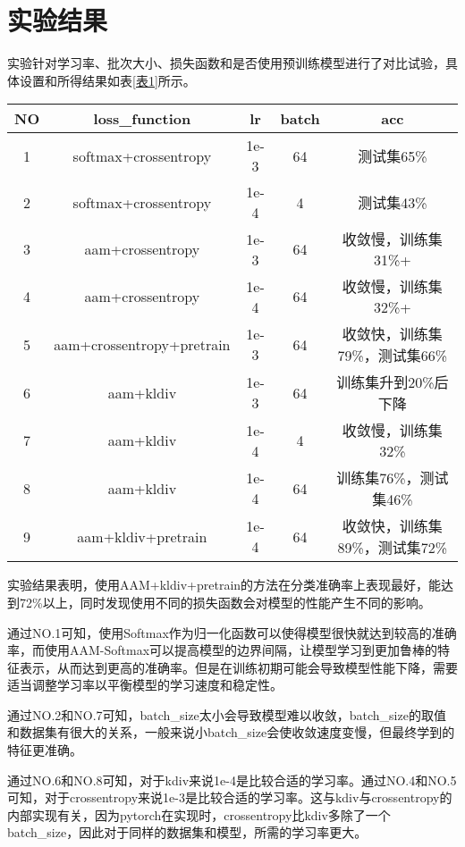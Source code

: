 \section{实验结果}
实验针对学习率、批次大小、损失函数和是否使用预训练模型进行了对比试验，具体设置和所得结果如表\ref{表1}所示。
\begin{center}
  \begin{tabular}{|c|c|c|c|c|}\hline
    NO&loss\_function &lr &batch&acc\\\hline
    1&softmax+crossentropy& 1e-3& 64&测试集65\%\\\hline
    2&softmax+crossentropy& 1e-4& 4&测试集43\%\\\hline
    3&aam+crossentropy& 1e-3& 64&收敛慢，训练集 31\%+\\\hline
    4&aam+crossentropy& 1e-4& 64&收敛慢，训练集 32\%+\\\hline
    5&aam+crossentropy+pretrain &1e-3& 64&收敛快，训练集79\%，测试集66\%\\\hline
    6&aam+kldiv& 1e-3& 64&训练集升到20\%后下降\\\hline
    7&aam+kldiv& 1e-4& 4 &收敛慢，训练集32\%\\\hline
    8&aam+kldiv &1e-4 &64&训练集76\%，测试集46\%\\\hline
    9&aam+kldiv+pretrain &1e-4& 64&收敛快，训练集89\%，测试集72\%\\\hline
  \end{tabular}
  \label{表1}
\end{center}


实验结果表明，使用AAM+kldiv+pretrain的方法在分类准确率上表现最好，能达到72\%以上，同时发现使用不同的损失函数会对模型的性能产生不同的影响。

通过NO.1可知，使用Softmax作为归一化函数可以使得模型很快就达到较高的准确率，而使用AAM-Softmax可以提高模型的边界间隔，让模型学习到更加鲁棒的特征表示，从而达到更高的准确率。但是在训练初期可能会导致模型性能下降，需要适当调整学习率以平衡模型的学习速度和稳定性。

通过NO.2和NO.7可知，batch\_size太小会导致模型难以收敛，batch\_size的取值和数据集有很大的关系，一般来说小batch\_size会使收敛速度变慢，但最终学到的特征更准确。

通过NO.6和NO.8可知，对于kdiv来说1e-4是比较合适的学习率。通过NO.4和NO.5可知，对于crossentropy来说1e-3是比较合适的学习率。这与kdiv与crossentropy的内部实现有关，因为pytorch在实现时，crossentropy比kdiv多除了一个batch\_size，因此对于同样的数据集和模型，所需的学习率更大。

